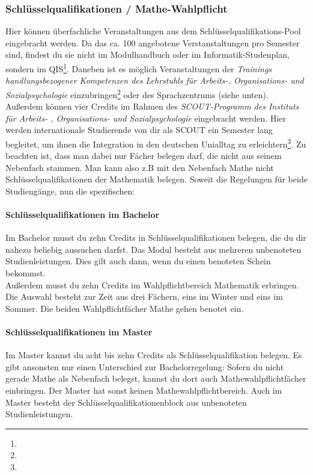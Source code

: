 	\subsubsection{Schlüsselqualifikationen / Mathe-Wahl\-pflicht}
	Hier können überfachliche Veranstaltungen aus dem Schlüsselqualifikations-Pool eingebracht werden. Da das ca. 100 angebotene Verstanstaltungen pro Semester sind, findest du sie nicht im Modulhandbuch oder im Informatik-Studenplan, sondern im QIS\footnote{}. Daneben ist es möglich Veranstaltungen der \textit{Trainings handlungsbezogener Kompetenzen des Lehrstuhls für Arbeits-, Organisations- und Sozialpsychologie} einzubringen\footnote{} oder des Sprachzentrums (siehe unten). 
	Außerdem können vier Credits im Rahmen des \textit{SCOUT-Programm des Instituts für Arbeits- , Organisations- und Sozialpsychologie} eingebracht werden. Hier werden internationale Studierende von dir als SCOUT ein Semester lang begleitet, um ihnen die Integration in den deutschen Unialltag zu erleichtern\footnote{}. Zu beachten ist, dass man dabei nur Fächer belegen darf, die nicht aus seinem Nebenfach stammen. Man kann also z.B mit den Nebenfach Mathe nicht Schlüsselqualifikationen der Mathematik belegen. Soweit die Regelungen für beide Studiengänge, nun die spezifischen:

	\paragraph*{Schlüsselqualifikationen im Bachelor}
	Im Bachelor musst du zehn Credits in Schlüsselqualifikationen belegen, die du dir nahezu beliebig aussuchen darfst. Das Modul besteht aus mehreren unbenoteten Studienleistungen. Dies gilt auch dann, wenn du einen benoteten Schein bekommst.\\
	Außerdem musst du zehn Credits im Wahlpflichtbereich Mathematik erbringen. Die Auswahl besteht zur Zeit aus drei Fächern, eins im Winter und eins im Sommer. Die beiden Wahlpflichtfächer Mathe gehen benotet ein.

	\paragraph*{Schlüsselqualifikationen im Master}
	Im Master kannst du acht bis zehn Credits als Schlüsselqualifikation belegen. Es gibt ansonsten nur einen Unterschied zur Bachelorregelung: Sofern du nicht gerade Mathe als Nebenfach belegst, kannst du dort auch Mathewahlpflichtfächer einbringen. Der Master hat sonst keinen Mathewahlpflichtbereich. Auch im Master besteht der Schlüsselqualifikationenblock aus unbenoteten Studienleistungen.

